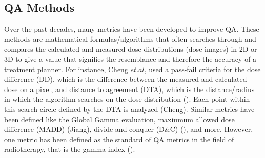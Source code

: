 \documentclass[12pt]{article}
\begin{document}
\subsection{QA Methods}
Over the past decades, many metrics have been developed to improve QA. These methods are mathematical formulas/algorithms that often searches through and compares the calculated and measured dose distributions (dose images) in 2D or 3D to give a value that signifies the resemblance and therefore the accuracy of a treatment planner. For instance, Cheng $et. al$, used a pass-fail criteria for the dose difference (DD), which is the difference between the measured and calculated dose on a pixel, and distance to agreement (DTA), which is the distance/radius in which the algorithm searches on the dose distribution (\textcite{Cheng}). Each point within this search circle defined by the DTA is analyzed (Cheng). Similar metrics have been defined like the Global Gamma evaluation, maxiumum allowed dose difference (MADD) (Jiang), divide and conquer (D\&C) (\textcite{Stojadinovic}), and more. However, one metric has been defined as the standard of QA metrics in the field of radiotherapy, that is the gamma index (\textcite{Low}).
\end{document}
